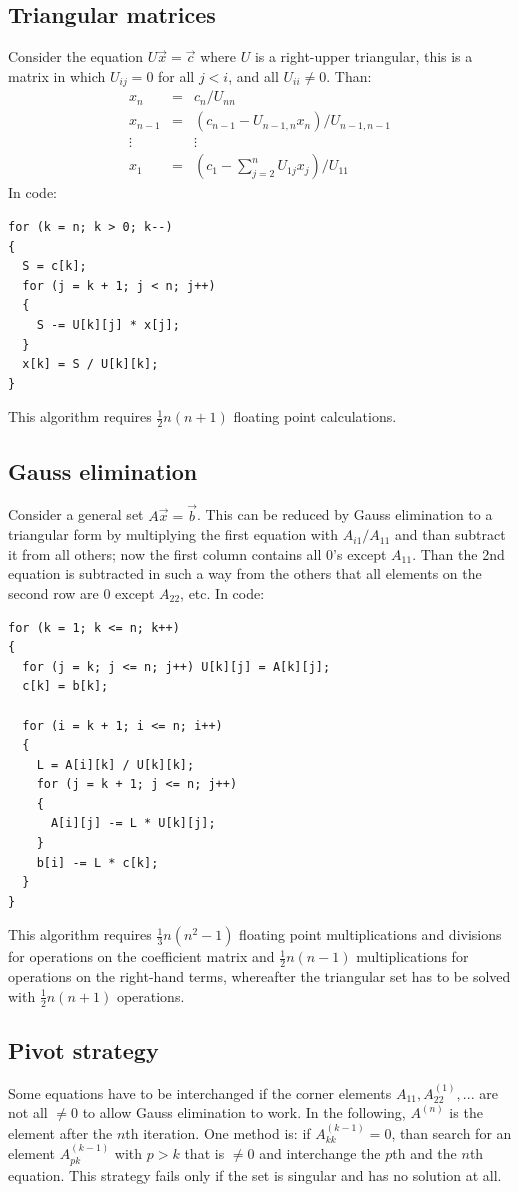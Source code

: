 \documentclass[twoside]{report}
\begin{document}
\subsection{Triangular matrices}
Consider the equation $U\vec{x}=\vec{c}$ where $U$ is a right-upper triangular,
this is a matrix in which $U_{ij}=0$ for all $j<i$, and all $U_{ii}\neq0$. Than:
\begin{eqnarray*}
x_n    &=&c_n/U_{nn}\\
x_{n-1}&=&(c_{n-1}-U_{n-1,n}x_n)/U_{n-1,n-1}\\
\vdots & &\vdots\\
x_1    &=&(c_1-\sum_{j=2}^nU_{1j}x_j)/U_{11}
\end{eqnarray*}
In code:
\begin{verbatim}
for (k = n; k > 0; k--)
{
  S = c[k];
  for (j = k + 1; j < n; j++)
  {
    S -= U[k][j] * x[j];
  }
  x[k] = S / U[k][k];
}
\end{verbatim}
This algorithm requires $\frac{1}{2}n(n+1)$ floating point calculations.

\subsection{Gauss elimination}
Consider a general set $A\vec{x}=\vec{b}$. This can be reduced by Gauss
elimination to a triangular form by multiplying the first equation with
$A_{i1}/A_{11}$ and than subtract it from all others; now the first column
contains all 0's except $A_{11}$. Than the 2nd equation is subtracted in
such a way from the others that all elements on the second row are 0 except
$A_{22}$, etc. In code:
\begin{verbatim}
for (k = 1; k <= n; k++)
{
  for (j = k; j <= n; j++) U[k][j] = A[k][j];
  c[k] = b[k];

  for (i = k + 1; i <= n; i++)
  {
    L = A[i][k] / U[k][k];
    for (j = k + 1; j <= n; j++)
    {
      A[i][j] -= L * U[k][j];
    }
    b[i] -= L * c[k];
  }
}
\end{verbatim}
This algorithm requires $\frac{1}{3}n(n^2-1)$ floating point multiplications
and divisions for operations on the coefficient matrix and $\frac{1}{2}n(n-1)$
multiplications for operations on the right-hand terms, whereafter the
triangular set has to be solved with $\frac{1}{2}n(n+1)$ operations.

\subsection{Pivot strategy}
Some equations have to be interchanged if the corner elements
$A_{11}, A^{(1)}_{22},...$ are not all $\neq0$ to allow Gauss elimination to
work. In the following, $A^{(n)}$ is the element after the $n$th iteration.
One method is: if $A^{(k-1)}_{kk}=0$, than search for an element $A^{(k-1)}_{pk}$
with $p>k$ that is $\neq0$ and interchange the $p$th and the $n$th equation. This
strategy fails only if the set is singular and has no solution at all.
\end{document}
